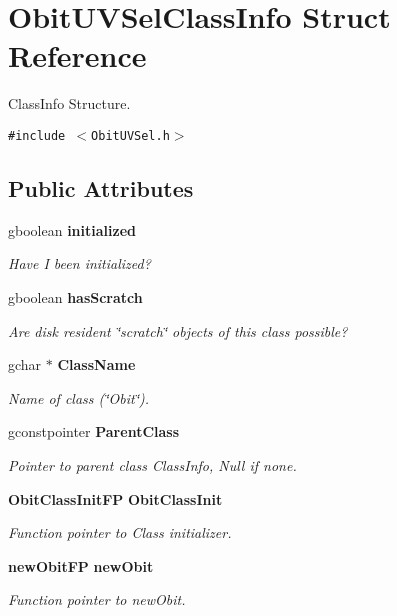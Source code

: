 \section{Obit\-UVSel\-Class\-Info Struct Reference}
\label{structObitUVSelClassInfo}
Class\-Info Structure.  


{\tt \#include $<$Obit\-UVSel.h$>$}

\subsection*{Public Attributes}
\begin{CompactItemize}
\item 
gboolean {\bf initialized}
\begin{CompactList}\small\item\em Have I been initialized? \item\end{CompactList}\item 
gboolean {\bf has\-Scratch}
\begin{CompactList}\small\item\em Are disk resident \char`\"{}scratch\char`\"{} objects of this class possible? \item\end{CompactList}\item 
gchar $\ast$ {\bf Class\-Name}
\begin{CompactList}\small\item\em Name of class (\char`\"{}Obit\char`\"{}). \item\end{CompactList}\item 
gconstpointer {\bf Parent\-Class}
\begin{CompactList}\small\item\em Pointer to parent class Class\-Info, Null if none. \item\end{CompactList}\item 
{\bf Obit\-Class\-Init\-FP} {\bf Obit\-Class\-Init}
\begin{CompactList}\small\item\em Function pointer to Class initializer. \item\end{CompactList}\item 
{\bf new\-Obit\-FP} {\bf new\-Obit}
\begin{CompactList}\small\item\em Function pointer to new\-Obit. \item\end{CompactList}\item 

\end{CompactItemize}
